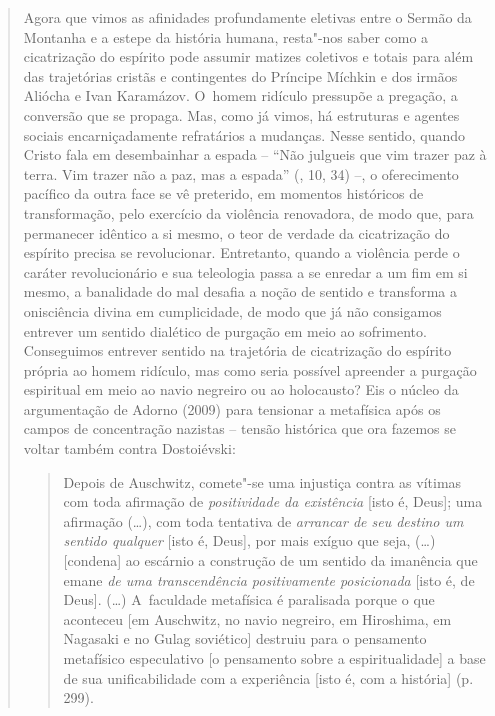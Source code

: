 {\begin{quote}
Agora que vimos as afinidades profundamente eletivas entre o Sermão da
Montanha e a estepe da história humana, resta"-nos saber como a
cicatrização do espírito pode assumir matizes coletivos e totais para
além das trajetórias cristãs e contingentes do Príncipe Míchkin e dos
irmãos Aliócha e Ivan Karamázov. O~homem ridículo pressupõe a pregação,
a conversão que se propaga. Mas, como já vimos, há estruturas e agentes
sociais encarniçadamente refratários a mudanças. Nesse sentido, quando
Cristo fala em desembainhar a espada -- ``Não julgueis que vim trazer
paz à terra. Vim trazer não a paz, mas a espada'' (, 10, 34) --, o
oferecimento pacífico da outra face se vê preterido, em momentos
históricos de transformação, pelo exercício da violência renovadora, de
modo que, para permanecer idêntico a si mesmo, o teor de verdade da
cicatrização do espírito precisa se revolucionar. Entretanto, quando a
violência perde o caráter revolucionário e sua teleologia passa a se
enredar a um fim em si mesmo, a banalidade do mal desafia a noção de
sentido e transforma a onisciência divina em cumplicidade, de modo que
já não consigamos entrever um sentido dialético de purgação em meio ao
sofrimento. Conseguimos entrever sentido na trajetória de cicatrização
do espírito própria ao homem ridículo, mas como seria possível apreender
a purgação espiritual em meio ao navio negreiro ou ao holocausto? Eis o
núcleo da argumentação de Adorno (2009) para tensionar a metafísica após
os campos de concentração nazistas -- tensão histórica que ora fazemos
se voltar também contra Dostoiévski:

\begin{quote}
Depois de Auschwitz, comete"-se uma injustiça contra as vítimas com toda
afirmação de \emph{positividade da existência} {[}isto é, Deus{]}; uma
afirmação (\ldots{}), com toda tentativa de \emph{arrancar de seu
destino um sentido qualquer} {[}isto é, Deus{]}, por mais exíguo que
seja, (\ldots{}) {[}condena{]} ao escárnio a construção de um sentido da
imanência que emane \emph{de uma transcendência positivamente
posicionada} {[}isto é, de Deus{]}. (\ldots{}) A~faculdade metafísica é
paralisada porque o que aconteceu {[}em Auschwitz, no navio negreiro, em
Hiroshima, em Nagasaki e no Gulag soviético{]} destruiu para o
pensamento metafísico especulativo {[}o pensamento sobre a
espiritualidade{]} a base de sua unificabilidade com a experiência
{[}isto é, com a história{]} (p. 299).
\end{quote}


\end{quote}}
